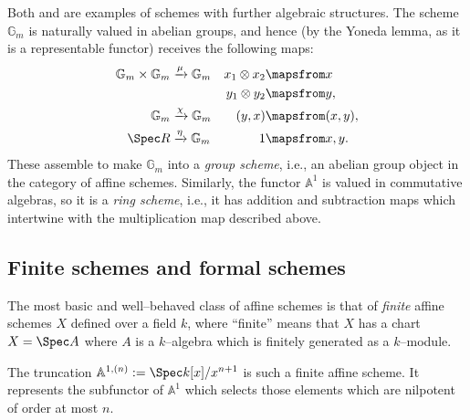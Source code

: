 \begin{remark}
Both  and  are examples of schemes with further algebraic structures.  The scheme $\mathbb G_m$ is naturally valued in abelian groups, and hence (by the Yoneda lemma, as it is a representable functor) receives the following maps:
\begin{align*}
\mathbb G_m \times \mathbb G_m & \xrightarrow{\mu} \mathbb G_m & x_1 \otimes x_2 & \mapsfrom x \\
& & y_1 \otimes y_2 & \mapsfrom y, \\
\mathbb G_m & \xrightarrow{\chi} \mathbb G_m & (y, x) & \mapsfrom (x, y), \\
\Spec R & \xrightarrow{\eta} \mathbb G_m & 1 & \mapsfrom x, y.
\end{align*}
These assemble to make $\mathbb G_m$ into a \textit{group scheme}, i.e., an abelian group object in the category of affine schemes.  Similarly, the functor $\mathbb A^1$ is valued in commutative algebras, so it is a \textit{ring scheme}, i.e., it has addition and subtraction maps which intertwine with the multiplication map described above.
\end{remark}

\subsection*{Finite schemes and formal schemes}

The most basic and well--behaved class of affine schemes is that of \textit{finite} affine schemes $X$ defined over a field $k$, where ``finite'' means that $X$ has a chart $X = \Spec A$ where $A$ is a $k$--algebra which is finitely generated as a $k$--module.
\begin{example}\label{DefnA1n}
The truncation $\mathbb A^{1, (n)} := \Spec k[x] / x^{n+1}$ is such a finite affine scheme.  It represents the subfunctor of $\mathbb A^1$ which selects those elements which are nilpotent of order at most $n$.
\end{example}

